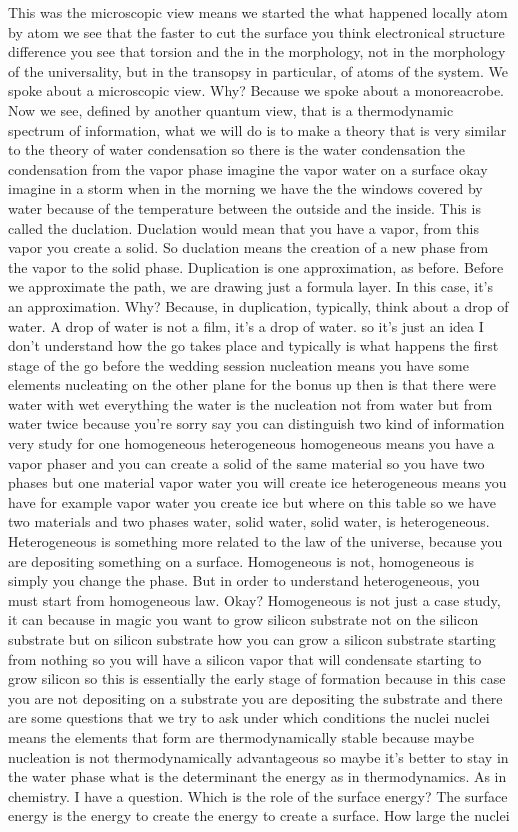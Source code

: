This was the microscopic view means we started the what happened locally atom by atom we see that the faster to cut the surface you think electronical structure difference you see that torsion and the in the morphology, not in the morphology of the universality, but in the transopsy in particular, of atoms of the system. We spoke about a microscopic view. Why? Because we spoke about a monoreacrobe. Now we see, defined by another quantum view, that is a thermodynamic spectrum of information, what we will do is to make a theory that is very similar to the theory of water condensation so there is the water condensation the condensation from the vapor phase imagine the vapor water on a surface okay imagine in a storm when in the morning we have the the windows covered by water because of the temperature between the outside and the inside. This is called the duclation. Duclation would mean that you have a vapor, from this vapor you create a solid. So duclation means the creation of a new phase from the vapor to the solid phase. Duplication is one approximation, as before. Before we approximate the path, we are drawing just a formula layer. In this case, it's an approximation. Why? Because, in duplication, typically, think about a drop of water. A drop of water is not a film, it's a drop of water. so it's just an idea I don't understand how the go takes place and typically is what happens the first stage of the go before the wedding session nucleation means you have some elements nucleating on the other plane for the bonus up then is that there were water with wet everything the water is the nucleation not from water but from water twice because you're sorry say you can distinguish two kind of information very study for one homogeneous heterogeneous homogeneous means you have a vapor phaser and you can create a solid of the same material so you have two phases but one material vapor water you will create ice heterogeneous means you have for example vapor water you create ice but where on this table so we have two materials and two phases water, solid water, solid water, is heterogeneous. Heterogeneous is something more related to the law of the universe, because you are depositing something on a surface. Homogeneous is not, homogeneous is simply you change the phase. But in order to understand heterogeneous, you must start from homogeneous law. Okay? Homogeneous is not just a case study, it can because in magic you want to grow silicon substrate not on the silicon substrate but on silicon substrate how you can grow a silicon substrate starting from nothing so you will have a silicon vapor that will condensate starting to grow silicon so this is essentially the early stage of formation because in this case you are not depositing on a substrate you are depositing the substrate and there are some questions that we try to ask under which conditions the nuclei nuclei means the elements that form are thermodynamically stable because maybe nucleation is not thermodynamically advantageous so maybe it's better to stay in the water phase what is the determinant the energy as in thermodynamics. As in chemistry. I have a question. Which is the role of the surface energy? The surface energy is the energy to create the energy to create a surface. How large the nuclei 
